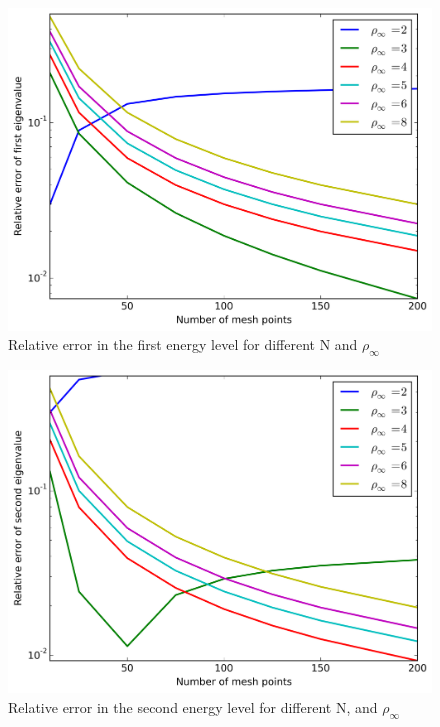 \documentclass[11pt,a4paper,english,final]{article}
\numberwithin{equation}{section}
\newcommand{\figurewidth}{.85\textwidth}
\begin{document}
\begin{figure}
\centering
\includegraphics[width=\figurewidth]{../results/rel_logE0.png}
\caption{Relative error in the first energy level for 
different N and $\rho_\infty$}
\label{fig:relE0}
\end{figure}

\begin{figure}
\centering
\includegraphics[width=\figurewidth]{../results/rel_logE1.png}
\caption{Relative error in the second energy level for different N,
and $\rho_\infty$}
\label{fig:relE1}
\end{figure}
\end{document}
